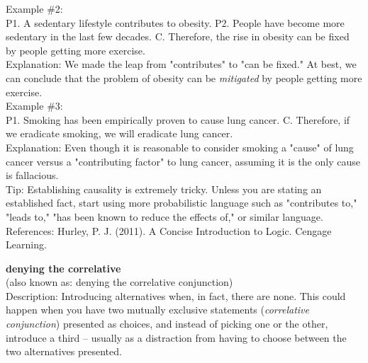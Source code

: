 \documentclass[a4paper,12pt,single,pdftex]{scrbook}
\begin{document}
    
      Example \#2:
    \\

    
      P1. A sedentary lifestyle contributes to obesity. \newline
P2. People have become more sedentary in the last few decades. \newline
C. Therefore, the rise in obesity can be fixed by people getting more exercise.
    \\

    
      Explanation: We made the leap from "contributes" to "can be fixed." At best, we can conclude that the problem of obesity can be {\it mitigated}  by people getting more exercise.
    \\

    
      Example \#3:
    \\

    
      P1. Smoking has been empirically proven to cause lung cancer. \newline
C. Therefore, if we eradicate smoking, we will eradicate lung cancer.
    \\

    
      Explanation: Even though it is reasonable to consider smoking a "cause" of lung cancer versus a "contributing factor" to lung cancer, assuming it is the only cause is fallacious.
    \\

    
      Tip: Establishing causality is extremely tricky. Unless you are stating an established fact, start using more probabilistic language such as "contributes to," "leads to," "has been known to reduce the effects of," or similar language.
    \\

    References: Hurley, P. J. (2011). A Concise Introduction to Logic. Cengage Learning.
  
    
      {\bf denying the correlative}
    \\

  
    
      (also known as: denying the correlative conjunction)
    \\

  
    Description: Introducing alternatives when, in fact, there are none.  This could happen when you have two mutually exclusive statements ({\it correlative conjunction}) presented as choices, and instead of picking one or the other, introduce a third -- usually as  a distraction from having to choose between the two alternatives presented. 
\end{document}
